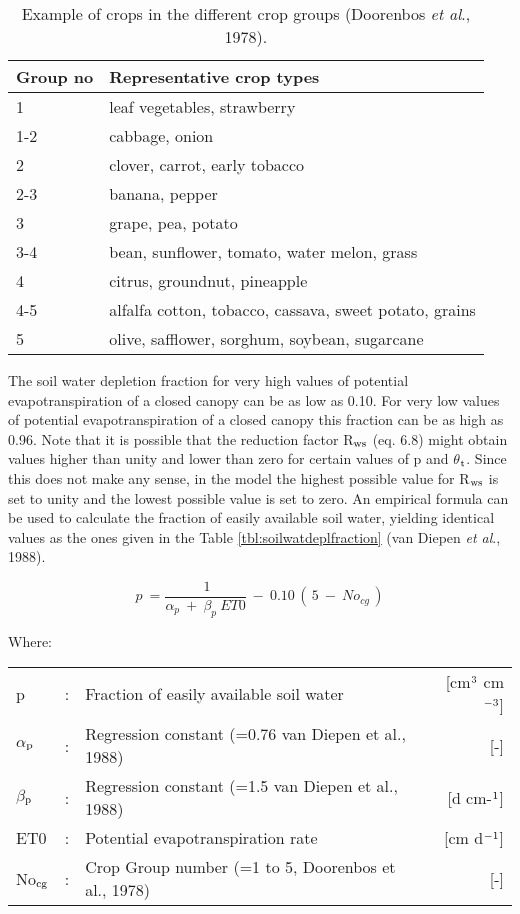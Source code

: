 \begin{table}
\caption{Example of crops in the different crop groups (Doorenbos {\it et al}., 1978).}
\label{tbl:ExampleCropGroups}
\begin{tabularx}{\textwidth}{lX}
\hline
Group no & Representative crop types\\
\hline
1 & leaf vegetables, strawberry\\     
1-2 & cabbage, onion\\
2 & clover, carrot, early tobacco\\     
2-3 & banana, pepper\\
3 & grape, pea, potato\\
3-4 & bean, sunflower, tomato, water melon, grass\\
4 & citrus, groundnut, pineapple\\
4-5 & alfalfa cotton, tobacco, cassava, sweet potato, grains\\
5 & olive, safflower, sorghum, soybean, sugarcane\\
\hline
\end{tabularx}
\end{table}

The soil water depletion fraction for very high values of potential evapotranspiration of a
closed canopy can be as low as 0.10. For very low values of potential evapotranspiration
of a closed canopy this fraction can be as high as 0.96.
Note that it is possible that the reduction factor R$_{{\rm ws}}$ (eq. 6.8) might obtain values higher
than unity and lower than zero for certain values of p and $\theta$$_{{\rm t}}$. Since this does not make
any sense, in the model the highest possible value for R$_{{\rm ws}}$ is set to unity and the lowest
possible value is set to zero.
An empirical formula can be used to calculate the fraction of easily available soil water,
yielding identical values as the ones given in the Table \ref{tbl:soilwatdeplfraction} 
(van Diepen {\it et al}., 1988).

\begin{equation}
p~={\frac{~1}{ \alpha _{p} ~+~ \beta _{p} ~ET0}} ~-~ 0.10\, (\, 5~-~No _{cg} \, )
\end{equation}

Where:\\[5pt]
\begin{tabularx}{\textwidth}{llXr}
p &:& Fraction of easily available soil water  & [cm$^{{\rm 3}}$ cm$^{{\rm -3}}$]\\
$\alpha$$_{{\rm p}}$ &:& Regression constant {\small (=0.76 van Diepen et al., 1988)}  & [-]\\
$\beta$$_{{\rm p}}$ &:& Regression constant {\small (=1.5 van Diepen et al., 1988)}  & [d cm-$^{{\rm 1}}$]\\
ET0 &:& Potential evapotranspiration rate  & [cm d$^{{\rm -1}}$]\\
No$_{{\rm cg}}$ &:& Crop Group number {\small (=1 to 5, Doorenbos et al., 1978)}  & [-]\\
\end{tabularx}
 
